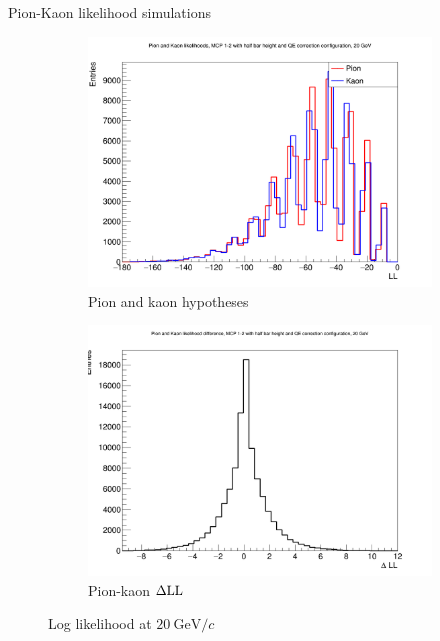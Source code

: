 \documentclass{beamer}
\begin{document}
\begin{frame}{Pion-Kaon likelihood simulations}
  \begin{figure}
    \centering
    \vspace{-0.2cm}
    \begin{subfigure}{0.5\textwidth}
      \includegraphics[width = 1.0\textwidth]{Plots/PionKaonLL20GeVStandardMCPAB.png}
      \caption{Pion and kaon hypotheses}
    \end{subfigure}%
    \begin{subfigure}{0.5\textwidth}
      \includegraphics[width = 1.0\textwidth]{Plots/PionKaonDLL20GeVStandardMCPAB.png}
      \caption{Pion-kaon $\Delta{\rm LL}$}
    \end{subfigure}
    \caption{Log likelihood at $\SI{20}{\giga\eV/c}$}
  \end{figure}
\end{frame}
\end{document}
